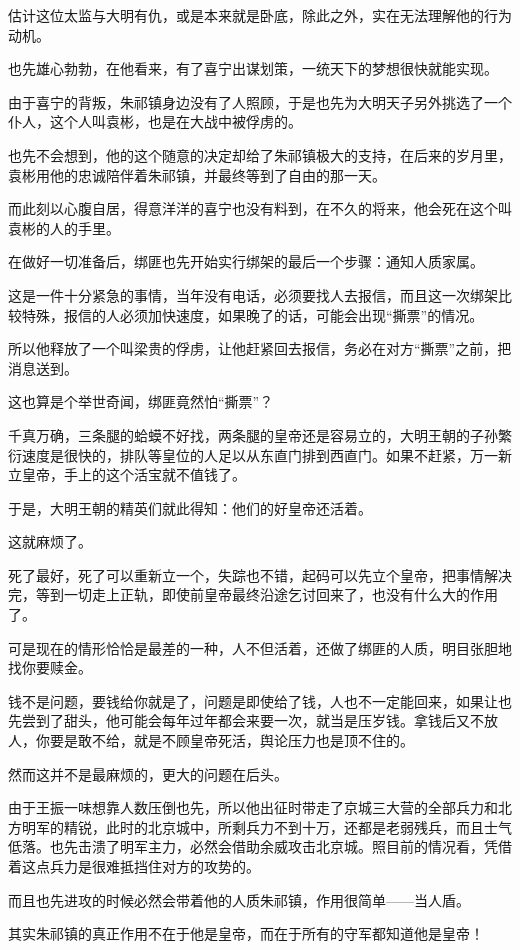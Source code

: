 \begin{multicols}{\theparacolNo}
估计这位太监与大明有仇，或是本来就是卧底，除此之外，实在无法理解他的行为动机。

也先雄心勃勃，在他看来，有了喜宁出谋划策，一统天下的梦想很快就能实现。

由于喜宁的背叛，朱祁镇身边没有了人照顾，于是也先为大明天子另外挑选了一个仆人，这个人叫袁彬，也是在大战中被俘虏的。

也先不会想到，他的这个随意的决定却给了朱祁镇极大的支持，在后来的岁月里，袁彬用他的忠诚陪伴着朱祁镇，并最终等到了自由的那一天。

而此刻以心腹自居，得意洋洋的喜宁也没有料到，在不久的将来，他会死在这个叫袁彬的人的手里。

在做好一切准备后，绑匪也先开始实行绑架的最后一个步骤：通知人质家属。

这是一件十分紧急的事情，当年没有电话，必须要找人去报信，而且这一次绑架比较特殊，报信的人必须加快速度，如果晚了的话，可能会出现“撕票”的情况。

所以他释放了一个叫梁贵的俘虏，让他赶紧回去报信，务必在对方“撕票”之前，把消息送到。

这也算是个举世奇闻，绑匪竟然怕“撕票”？

千真万确，三条腿的蛤蟆不好找，两条腿的皇帝还是容易立的，大明王朝的子孙繁衍速度是很快的，排队等皇位的人足以从东直门排到西直门。如果不赶紧，万一新立皇帝，手上的这个活宝就不值钱了。

于是，大明王朝的精英们就此得知：他们的好皇帝还活着。

这就麻烦了。

死了最好，死了可以重新立一个，失踪也不错，起码可以先立个皇帝，把事情解决完，等到一切走上正轨，即使前皇帝最终沿途乞讨回来了，也没有什么大的作用了。

可是现在的情形恰恰是最差的一种，人不但活着，还做了绑匪的人质，明目张胆地找你要赎金。

钱不是问题，要钱给你就是了，问题是即使给了钱，人也不一定能回来，如果让也先尝到了甜头，他可能会每年过年都会来要一次，就当是压岁钱。拿钱后又不放人，你要是敢不给，就是不顾皇帝死活，舆论压力也是顶不住的。

然而这并不是最麻烦的，更大的问题在后头。

由于王振一味想靠人数压倒也先，所以他出征时带走了京城三大营的全部兵力和北方明军的精锐，此时的北京城中，所剩兵力不到十万，还都是老弱残兵，而且士气低落。也先击溃了明军主力，必然会借助余威攻击北京城。照目前的情况看，凭借着这点兵力是很难抵挡住对方的攻势的。

而且也先进攻的时候必然会带着他的人质朱祁镇，作用很简单——当人盾。

其实朱祁镇的真正作用不在于他是皇帝，而在于所有的守军都知道他是皇帝！


\end{multicols}

